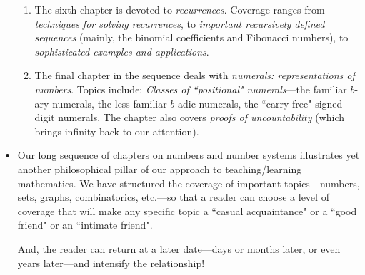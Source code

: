 \documentclass{article}[12pt]
\begin{document}
\begin{itemize}
\begin{enumerate}
  \item
The sixth chapter is devoted to {\em recurrences}.  Coverage ranges from {\em techniques for solving recurrences}, to {\em important recursively defined sequences} (mainly, the binomial coefficients and Fibonacci numbers), to {\em sophisticated examples and applications}.
  \item
The final chapter in the sequence deals with {\em numerals: representations of numbers}.  Topics include: {\em Classes of ``positional" numerals}---the familiar $b$-ary numerals, the less-familiar $b$-adic numerals, the ``carry-free" signed-digit numerals.  The chapter also covers {\em proofs of uncountability} (which brings infinity back to our attention).  
  \end{enumerate}

\item
Our long sequence of chapters on numbers and number systems illustrates yet another philosophical pillar of our approach to teaching/learning mathematics.  We have structured the coverage of important topics---numbers, sets, graphs, combinatorics, etc.---so that a reader can choose a level of coverage that will make any specific topic a ``casual acquaintance" or a ``good friend" or an ``intimate friend".

\smallskip

And, the reader can return at a later date---days or months later, or even years later---and intensify the relationship!
\end{itemize}
\end{document}
